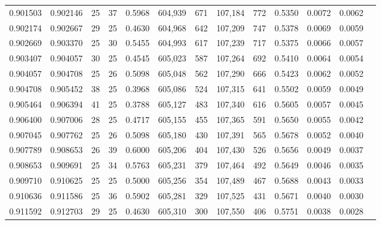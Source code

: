 \begin{tabular}{rrrrrrrrrrrrr}
0.901503 & 0.902146 &    25 &  37 &                                     0.5968 & 604,939 &     671 & 107,184 &     772 & 0.5350 & 0.0072 & 0.0062 \\
0.902174 & 0.902667 &    29 &  25 &                                     0.4630 & 604,968 &     642 & 107,209 &     747 & 0.5378 & 0.0069 & 0.0059 \\
0.902669 & 0.903370 &    25 &  30 &                                     0.5455 & 604,993 &     617 & 107,239 &     717 & 0.5375 & 0.0066 & 0.0057 \\
0.903407 & 0.904057 &    30 &  25 &                                     0.4545 & 605,023 &     587 & 107,264 &     692 & 0.5410 & 0.0064 & 0.0054 \\
0.904057 & 0.904708 &    25 &  26 &                                     0.5098 & 605,048 &     562 & 107,290 &     666 & 0.5423 & 0.0062 & 0.0052 \\
0.904708 & 0.905452 &    38 &  25 &                                     0.3968 & 605,086 &     524 & 107,315 &     641 & 0.5502 & 0.0059 & 0.0049 \\
0.905464 & 0.906394 &    41 &  25 &                                     0.3788 & 605,127 &     483 & 107,340 &     616 & 0.5605 & 0.0057 & 0.0045 \\
0.906400 & 0.907006 &    28 &  25 &                                     0.4717 & 605,155 &     455 & 107,365 &     591 & 0.5650 & 0.0055 & 0.0042 \\
0.907045 & 0.907762 &    25 &  26 &                                     0.5098 & 605,180 &     430 & 107,391 &     565 & 0.5678 & 0.0052 & 0.0040 \\
0.907789 & 0.908653 &    26 &  39 &                                     0.6000 & 605,206 &     404 & 107,430 &     526 & 0.5656 & 0.0049 & 0.0037 \\
0.908653 & 0.909691 &    25 &  34 &                                     0.5763 & 605,231 &     379 & 107,464 &     492 & 0.5649 & 0.0046 & 0.0035 \\
0.909710 & 0.910625 &    25 &  25 &                                     0.5000 & 605,256 &     354 & 107,489 &     467 & 0.5688 & 0.0043 & 0.0033 \\
0.910636 & 0.911586 &    25 &  36 &                                     0.5902 & 605,281 &     329 & 107,525 &     431 & 0.5671 & 0.0040 & 0.0030 \\
0.911592 & 0.912703 &    29 &  25 &                                     0.4630 & 605,310 &     300 & 107,550 &     406 & 0.5751 & 0.0038 & 0.0028 \\

\end{tabular}
